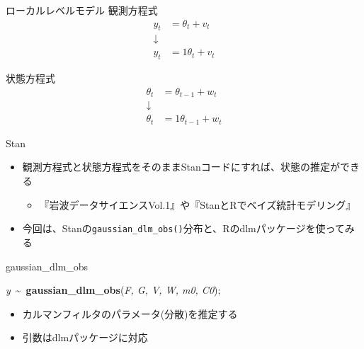 \documentclass[dvipdfmx,12pt]{beamer}
\begin{document}
\begin{frame}{ローカルレベルモデル}
  観測方程式
  \begin{align*}
    y_{t} &= \theta_{t} + v_{t} \\
    \downarrow \\
    y_{t} &= 1 \theta_{t} + v_{t}
  \end{align*}

  状態方程式
  \begin{align*}
    \theta_{t} &= \theta_{t-1} + w_{t} \\
    \downarrow \\
    \theta_{t} &= 1 \theta_{t-1} + w_{t}
  \end{align*}
\end{frame}

\begin{frame}{Stan}
\begin{itemize}
\item 観測方程式と状態方程式をそのまま\textsf{Stan}コードにすれば、状態の推定ができる
\begin{itemize}
\item 『岩波データサイエンスVol.1』や『StanとRでベイズ統計モデリング』
\end{itemize}
\item 今回は、\textsf{Stan}の\texttt{gaussian\_dlm\_obs()}分布と、\textsf{R}の\textsf{dlm}パッケージを使ってみる
\end{itemize}
\end{frame}

\begin{frame}{gaussian\_dlm\_obs}

\textit{y}~\textasciitilde~\textbf{gaussian\_dlm\_obs}(\textit{F, G, V, W, m0, C0});

\begin{itemize}
\item カルマンフィルタのパラメータ(分散)を推定する
\item 引数は\textsf{dlm}パッケージに対応
\end{itemize}
\end{frame}
\end{document}
